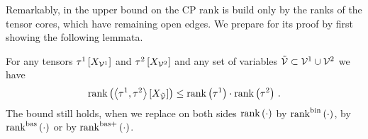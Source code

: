 Remarkably, in  the upper bound on the CP rank is build only by the ranks of the tensor cores, which have remaining open edges.
We prepare for its proof by first showing the following lemmata.

\begin{lemma}
    \label{lem:sparsityGeneralContraction}
    For any tensors $\tau^{1}\left[X_{\mathcal{V}^{1}}\right]$ and $\tau^{2}\left[X_{\mathcal{V}^{2}}\right]$ and any set of variables $\tilde{\mathcal{V}}\subset\mathcal{V}^{1}\cup\mathcal{V}^{2}$ we have
    \begin{align*}
        \mathrm{rank}\left(\left\langle \tau^{1},\tau^{2}\right\rangle \left[ X_{\tilde{\mathcal{V}}} \right]\right) \leq \mathrm{rank}\left(\tau^{1}\right) \cdot \mathrm{rank}\left(\tau^{2}\right) \, .
    \end{align*}
    The bound still holds, when we replace on both sides $\mathrm{rank}\left(\cdot\right)$ by $\mathrm{rank}^{\mathrm{bin}}\left(\cdot\right)$, by $\mathrm{rank}^{\mathrm{bas}}\left(\cdot\right)$ or by $\mathrm{rank}^{\mathrm{bas+}}\left(\cdot\right)$.
\end{lemma}

